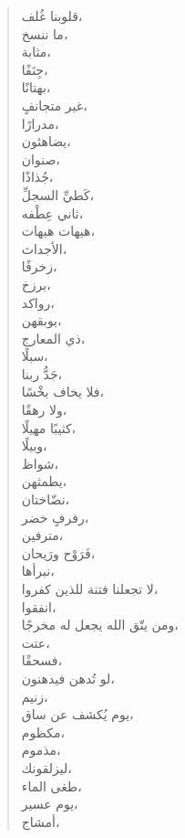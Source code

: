 \documentclass[12pt]{memoir}
\begin{document}
\begin{quote}
\begin{Arabic}
\begin{multicols}{3}\raggedleft
قلوبنا غُلف،\\
ما ننسخ،\\
مثابة،\\
جِنَفًا،\\
بهتانًا،\\
غير متجانفٍ،\\
مدرارًا،\\
يضاهئون،\\
صنوان،\\
جُذاذًا،\\
كَطيِّ السجلِّ،\\
ثاني عِطْفه،\\
هيهات هيهات،\\
الأجداث،\\
زخرفًا،\\
برزخ،\\
رواكد،\\
يوبقهن،\\
ذي المعارج،\\
سبلًا،\\
جَدُّ ربنا،\\
فلا يخاف بخْسًا،\\
ولا رهقًا،\\
كثيبًا مهيلًا،\\
وبيلًا،\\
شواظ،\\
يطمثهن،\\
نضّاختان،\\
رفرفٍ خضر،\\
مترفين،\\
فَرَوْح ورَيحان،\\
نبرأها،\\
لا تجعلنا فتنة للذين كفروا،\\
انفقوا،\\
ومن يتّق الله يجعل له مخرجًا،\\
عتت،\\
فسحقًا،\\
لو تُدهن فيدهنون،\\
زنيم،\\
يوم يُكشف عن ساق،\\
مكظوم،\\
مذموم،\\
ليزلقونك،\\
طغى الماء،\\
يوم عسير،\\
أمشاج،\\

\end{multicols}
\end{Arabic}
\end{quote}
\end{document}
